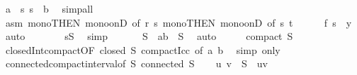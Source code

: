\begin{isabellebody}
\ {\isachardoublequoteopen}a\ {\isasymle}\ s{\isachardoublequoteclose}\ {\isachardoublequoteopen}s\ {\isasymle}\ b{\isachardoublequoteclose}\ \isamarkupfalse%
\ simp{\isacharunderscore}{\kern0pt}all\isanewline
\ \ \ \ \isamarkupfalse%
\ \isamarkupfalse%
\ asm\ mono{\isacharbrackleft}{\kern0pt}THEN\ mono{\isacharunderscore}{\kern0pt}onD{\isacharcomma}{\kern0pt}\ of\ r\ s{\isacharbrackright}{\kern0pt}\ mono{\isacharbrackleft}{\kern0pt}THEN\ mono{\isacharunderscore}{\kern0pt}onD{\isacharcomma}{\kern0pt}\ of\ s\ t{\isacharbrackright}{\kern0pt}\isanewline
\ \ \ \ \isamarkupfalse%
\ {\isachardoublequoteopen}f\ s\ {\isacharequal}{\kern0pt}\ y{\isachardoublequoteclose}\ \isamarkupfalse%
\ auto\isanewline
\ \ \ \ \isamarkupfalse%
\ \isamarkupfalse%
\ {\isachardoublequoteopen}s{\isasymin}{\isacharquery}{\kern0pt}S{\isachardoublequoteclose}\ \isamarkupfalse%
\ simp\isanewline
\ \ \isamarkupfalse%
\isanewline
\ \ \isamarkupfalse%
\ {\isachardoublequoteopen}{\isacharquery}{\kern0pt}S\ {\isasyminter}\ {\isacharbraceleft}{\kern0pt}a{\isachardot}{\kern0pt}{\isachardot}{\kern0pt}b{\isacharbraceright}{\kern0pt}\ {\isacharequal}{\kern0pt}\ {\isacharquery}{\kern0pt}S{\isachardoublequoteclose}\ \isamarkupfalse%
\ auto\isanewline
\ \ \isamarkupfalse%
\ \isamarkupfalse%
\ {\isachardoublequoteopen}compact\ {\isacharquery}{\kern0pt}S{\isachardoublequoteclose}\isanewline
\ \ \ \ \isamarkupfalse%
\ closed{\isacharunderscore}{\kern0pt}Int{\isacharunderscore}{\kern0pt}compact{\isacharbrackleft}{\kern0pt}OF\ {\isacartoucheopen}closed\ {\isacharquery}{\kern0pt}S{\isacartoucheclose}\ compact{\isacharunderscore}{\kern0pt}Icc{\isacharcomma}{\kern0pt}\ of\ a\ b{\isacharbrackright}{\kern0pt}\ \isamarkupfalse%
\ {\isacharparenleft}{\kern0pt}simp\ only{\isacharcolon}{\kern0pt}{\isacharparenright}{\kern0pt}\isanewline
\ \ \isamarkupfalse%
\ connected{\isacharunderscore}{\kern0pt}compact{\isacharunderscore}{\kern0pt}interval{\isacharunderscore}{\kern0pt}{}{\isacharbrackleft}{\kern0pt}of\ {\isacharquery}{\kern0pt}S{\isacharbrackright}{\kern0pt}\ {\isacartoucheopen}connected\ {\isacharquery}{\kern0pt}S{\isacartoucheclose}\isanewline
\ \ \isamarkupfalse%
\ u\ v\ \ {\isachardoublequoteopen}{\isacharquery}{\kern0pt}S\ {\isacharequal}{\kern0pt}\ {\isacharbraceleft}{\kern0pt}u{\isachardot}{\kern0pt}{\isachardot}{\kern0pt}v{\isacharbraceright}{\kern0pt}{\isachardoublequoteclose}\ \isamarkupfalse%

\end{isabellebody}
